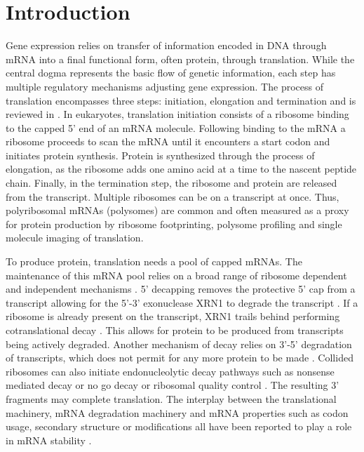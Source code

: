 \documentclass[a4,center,fleqn,nocrop]{NAR}
\begin{document}
\enlargethispage{-65.1pt}


\section{Introduction}

Gene expression relies on transfer of information encoded in DNA through mRNA into a final functional form, often protein, through translation. While the central dogma represents the basic flow of genetic information, each step has multiple regulatory mechanisms adjusting gene expression. The process of translation encompasses three steps: initiation, elongation and termination and is reviewed in \citep{RN1,RN2}. In eukaryotes, translation initiation consists of a ribosome binding to the capped 5' end of an mRNA molecule. Following binding to the mRNA a ribosome proceeds to scan the mRNA until it encounters a start codon and initiates protein synthesis. Protein is synthesized through the process of elongation, as the ribosome adds one amino acid at a time to the nascent peptide chain. Finally, in the termination step, the ribosome and protein are released from the transcript. Multiple ribosomes can be on a transcript at once. Thus, polyribosomal mRNAs (polysomes) are common and often measured as a proxy for protein production by ribosome footprinting, polysome profiling and single molecule imaging of translation. %


To produce protein, translation needs a pool of capped mRNAs. The maintenance of this mRNA pool relies on a broad range of ribosome dependent and independent mechanisms \citep{RN3}. 5' decapping removes the protective 5' cap from a transcript allowing for the 5'-3' exonuclease XRN1 to degrade the transcript \citep{RN3}. If a ribosome is already present on the transcript, XRN1 trails behind performing cotranslational decay \citep{RN4}. This allows for protein to be produced from transcripts being actively degraded. Another mechanism of decay relies on 3'-5' degradation of transcripts, which does not permit for any more protein to be made \citep{RN5}. Collided ribosomes can also initiate endonucleolytic decay pathways such as nonsense mediated decay or no go decay or ribosomal quality control \citep{RN6,RN7}. The resulting 3' fragments may complete translation. The interplay between the translational machinery, mRNA degradation machinery and mRNA properties such as codon usage, secondary structure or modifications all have been reported to play a role in mRNA stability \citep{RN8, RN9, RN10}.
\end{document}
